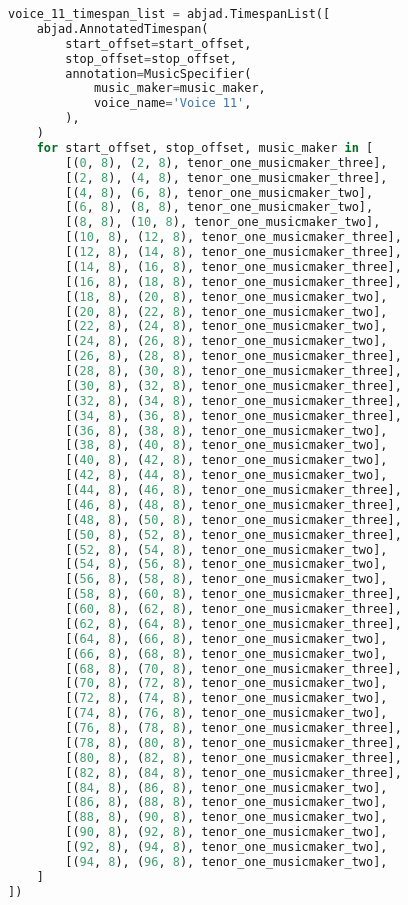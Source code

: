 \begin{lstlisting}[language=Python, caption=Invocation Source Code]
voice_11_timespan_list = abjad.TimespanList([
    abjad.AnnotatedTimespan(
        start_offset=start_offset,
        stop_offset=stop_offset,
        annotation=MusicSpecifier(
            music_maker=music_maker,
            voice_name='Voice 11',
        ),
    )
    for start_offset, stop_offset, music_maker in [
        [(0, 8), (2, 8), tenor_one_musicmaker_three],
        [(2, 8), (4, 8), tenor_one_musicmaker_three],
        [(4, 8), (6, 8), tenor_one_musicmaker_two],
        [(6, 8), (8, 8), tenor_one_musicmaker_two],
        [(8, 8), (10, 8), tenor_one_musicmaker_two],
        [(10, 8), (12, 8), tenor_one_musicmaker_three],
        [(12, 8), (14, 8), tenor_one_musicmaker_three],
        [(14, 8), (16, 8), tenor_one_musicmaker_three],
        [(16, 8), (18, 8), tenor_one_musicmaker_three],
        [(18, 8), (20, 8), tenor_one_musicmaker_two],
        [(20, 8), (22, 8), tenor_one_musicmaker_two],
        [(22, 8), (24, 8), tenor_one_musicmaker_two],
        [(24, 8), (26, 8), tenor_one_musicmaker_two],
        [(26, 8), (28, 8), tenor_one_musicmaker_three],
        [(28, 8), (30, 8), tenor_one_musicmaker_three],
        [(30, 8), (32, 8), tenor_one_musicmaker_three],
        [(32, 8), (34, 8), tenor_one_musicmaker_three],
        [(34, 8), (36, 8), tenor_one_musicmaker_three],
        [(36, 8), (38, 8), tenor_one_musicmaker_two],
        [(38, 8), (40, 8), tenor_one_musicmaker_two],
        [(40, 8), (42, 8), tenor_one_musicmaker_two],
        [(42, 8), (44, 8), tenor_one_musicmaker_two],
        [(44, 8), (46, 8), tenor_one_musicmaker_three],
        [(46, 8), (48, 8), tenor_one_musicmaker_three],
        [(48, 8), (50, 8), tenor_one_musicmaker_three],
        [(50, 8), (52, 8), tenor_one_musicmaker_three],
        [(52, 8), (54, 8), tenor_one_musicmaker_two],
        [(54, 8), (56, 8), tenor_one_musicmaker_two],
        [(56, 8), (58, 8), tenor_one_musicmaker_two],
        [(58, 8), (60, 8), tenor_one_musicmaker_three],
        [(60, 8), (62, 8), tenor_one_musicmaker_three],
        [(62, 8), (64, 8), tenor_one_musicmaker_three],
        [(64, 8), (66, 8), tenor_one_musicmaker_two],
        [(66, 8), (68, 8), tenor_one_musicmaker_two],
        [(68, 8), (70, 8), tenor_one_musicmaker_three],
        [(70, 8), (72, 8), tenor_one_musicmaker_two],
        [(72, 8), (74, 8), tenor_one_musicmaker_two],
        [(74, 8), (76, 8), tenor_one_musicmaker_two],
        [(76, 8), (78, 8), tenor_one_musicmaker_three],
        [(78, 8), (80, 8), tenor_one_musicmaker_three],
        [(80, 8), (82, 8), tenor_one_musicmaker_three],
        [(82, 8), (84, 8), tenor_one_musicmaker_three],
        [(84, 8), (86, 8), tenor_one_musicmaker_two],
        [(86, 8), (88, 8), tenor_one_musicmaker_two],
        [(88, 8), (90, 8), tenor_one_musicmaker_two],
        [(90, 8), (92, 8), tenor_one_musicmaker_two],
        [(92, 8), (94, 8), tenor_one_musicmaker_two],
        [(94, 8), (96, 8), tenor_one_musicmaker_two],
    ]
])


\end{lstlisting}
